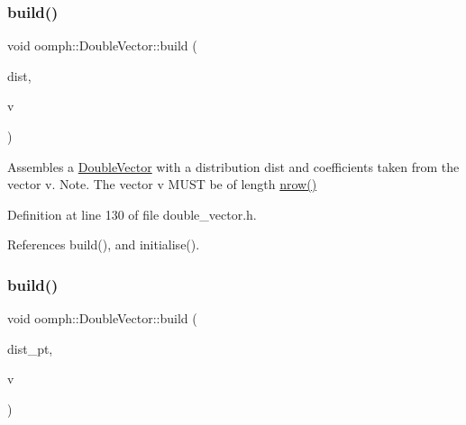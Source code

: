 \subsubsection{\texorpdfstring{build()}{build()}\hspace{0.1cm}{\footnotesize\ttfamily [4/5]}}
{\footnotesize\ttfamily void oomph\+::\+Double\+Vector\+::build (\begin{DoxyParamCaption}\item[{const \hyperlink{classoomph_1_1LinearAlgebraDistribution}{Linear\+Algebra\+Distribution} \&}]{dist,  }\item[{const \hyperlink{classoomph_1_1Vector}{Vector}$<$ double $>$ \&}]{v }\end{DoxyParamCaption})\hspace{0.3cm}{\ttfamily [inline]}}



Assembles a \hyperlink{classoomph_1_1DoubleVector}{Double\+Vector} with a distribution dist and coefficients taken from the vector v. Note. The vector v M\+U\+ST be of length \hyperlink{classoomph_1_1DistributableLinearAlgebraObject_a7569556f14fd68b28508920e89bd5eee}{nrow()} 



Definition at line 130 of file double\+\_\+vector.\+h.



References build(), and initialise().

\mbox{\label{classoomph_1_1DoubleVector_a4e6219936d6b23265b46dd3a25acb7c8}} 
\subsubsection{\texorpdfstring{build()}{build()}\hspace{0.1cm}{\footnotesize\ttfamily [5/5]}}
{\footnotesize\ttfamily void oomph\+::\+Double\+Vector\+::build (\begin{DoxyParamCaption}\item[{const \hyperlink{classoomph_1_1LinearAlgebraDistribution}{Linear\+Algebra\+Distribution} $\ast$const \&}]{dist\+\_\+pt,  }\item[{const \hyperlink{classoomph_1_1Vector}{Vector}$<$ double $>$ \&}]{v }\end{DoxyParamCaption})}



